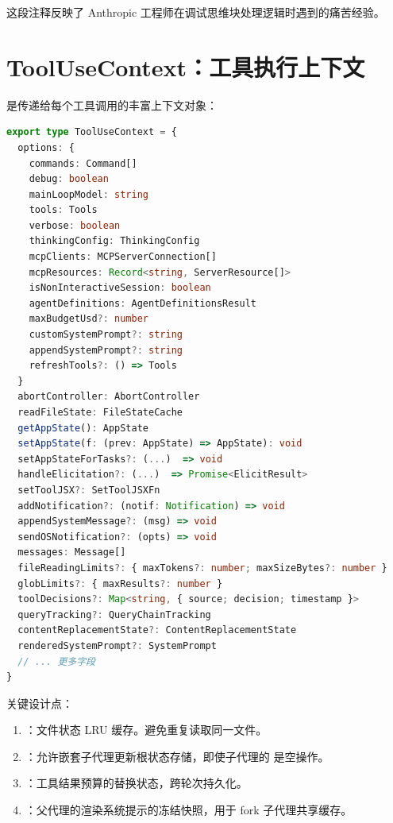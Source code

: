这段注释反映了 Anthropic 工程师在调试思维块处理逻辑时遇到的痛苦经验。

\section{ToolUseContext：工具执行上下文}

 是传递给每个工具调用的丰富上下文对象：

\begin{lstlisting}[language=TypeScript,breaklines=true]
export type ToolUseContext = {
  options: {
    commands: Command[]
    debug: boolean
    mainLoopModel: string
    tools: Tools
    verbose: boolean
    thinkingConfig: ThinkingConfig
    mcpClients: MCPServerConnection[]
    mcpResources: Record<string, ServerResource[]>
    isNonInteractiveSession: boolean
    agentDefinitions: AgentDefinitionsResult
    maxBudgetUsd?: number
    customSystemPrompt?: string
    appendSystemPrompt?: string
    refreshTools?: () => Tools
  }
  abortController: AbortController
  readFileState: FileStateCache
  getAppState(): AppState
  setAppState(f: (prev: AppState) => AppState): void
  setAppStateForTasks?: (...)  => void
  handleElicitation?: (...)  => Promise<ElicitResult>
  setToolJSX?: SetToolJSXFn
  addNotification?: (notif: Notification) => void
  appendSystemMessage?: (msg) => void
  sendOSNotification?: (opts) => void
  messages: Message[]
  fileReadingLimits?: { maxTokens?: number; maxSizeBytes?: number }
  globLimits?: { maxResults?: number }
  toolDecisions?: Map<string, { source; decision; timestamp }>
  queryTracking?: QueryChainTracking
  contentReplacementState?: ContentReplacementState
  renderedSystemPrompt?: SystemPrompt
  // ... 更多字段
}
\end{lstlisting}

关键设计点：

\begin{enumerate}[nosep]
  \item \textbf{}：文件状态 LRU 缓存。避免重复读取同一文件。
  \item \textbf{}：允许嵌套子代理更新根状态存储，即使子代理的  是空操作。
  \item \textbf{}：工具结果预算的替换状态，跨轮次持久化。
  \item \textbf{}：父代理的渲染系统提示的冻结快照，用于 fork 子代理共享缓存。
\end{enumerate}


